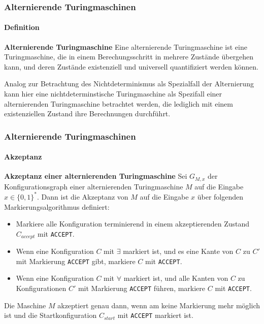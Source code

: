 \begin{frame}
    \frametitle{Alternierende Turingmaschinen}
    \framesubtitle{Definition}
    \begin{block}{\textbf{Alternierende Turingmaschine}}
        Eine alternierende Turingmaschine ist eine Turingmaschine, die in einem Berechungsschritt in mehrere Zustände übergehen kann,
        und deren Zustände existenziell und universell quantifiziert werden können.
    \end{block}
    Analog zur Betrachtung des Nichtdeterminismus als Spezialfall der Alternierung kann hier eine nichtdeterminstische Turingmaschine als Spezifall einer alternierenden
    Turingmaschine betrachtet werden, die lediglich mit einem existenziellen Zustand ihre Berechnungen durchführt.

\end{frame}

\begin{frame}
    \frametitle{Alternierende Turingmaschinen}
    \framesubtitle{Akzeptanz}
    \begin{block}{\textbf{Akzeptanz einer alternierenden Turingmaschine}}
        Sei $G_{M,x}$ der Konfigurationsgraph einer alternierenden Turingmaschine $M$ auf die Eingabe $x \in \{0, 1\}^*$.
        Dann ist die Akzeptanz von $M$ auf die Eingabe $x$ über folgenden Markierungsalgorithmus definiert:
        \begin{itemize}
            \item Markiere alle Konfiguration terminierend in einem akzeptierenden Zustand $C_{accept}$ mit \texttt{ACCEPT}.
            \item Wenn eine Konfiguration $C$ mit $\exists$ markiert ist, und es eine Kante von $C$ zu $C'$ mit
            Markierung \texttt{ACCEPT} gibt, markiere $C$ mit \texttt{ACCEPT}.
            \item Wenn eine Konfiguration $C$ mit $\forall$ markiert ist, und alle Kanten von $C$ zu
            Konfigurationen $C'$ mit Markierung \texttt{ACCEPT} führen, markiere $C$ mit \texttt{ACCEPT}.
        \end{itemize}
        Die Maschine $M$ akzeptiert genau dann, wenn am keine Markierung mehr möglich ist und die Startkonfiguration $C_{start}$ mit \texttt{ACCEPT}
        markiert ist.
    \end{block}

\end{frame}

